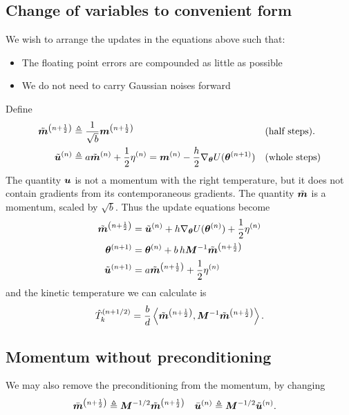 \documentclass{article}
\begin{document}
{\subsection{Change of variables to convenient form}
We wish to arrange the updates in the equations above such that:
\begin{itemize}
 \item The floating point errors are compounded as little as possible
 \item We do not need to carry Gaussian noises forward
\end{itemize}

Define
\begin{align}
  \tilde{{\bm{m}}}^{{\left( n+\frac{1}{2} \right)}} &\triangleq \frac{1}{\sqrt{b}}{\bm{m}}^{{\left( n+\frac{1}{2} \right)}} &&\text{(half steps)}. \\
\tilde{{\bm{u}}}^{{\left( n \right)}} &\triangleq a\tilde{{\bm{m}}}^{{\left( n \right)}} + \frac{1}{2}\eta^{{\left( n \right)}} = {\bm{m}}^{{\left( n \right)}} - \frac{h}{2}{\nabla_{\boldsymbol\theta} U({\boldsymbol\theta}^{{\left( n+1 \right)}})} &&\text{(whole steps)} \\
\end{align}
The quantity ${\bm{u}}$ is not a momentum with the right temperature, but it does not
contain gradients from its contemporaneous gradients. The quantity $\tilde{{\bm{m}}}$
is a momentum, scaled by $\sqrt{b}$. Thus the update equations become
\begin{align}
\tilde{{\bm{m}}}^{{\left( n+\frac{1}{2} \right)}} &= \tilde{{\bm{u}}}^{{\left( n \right)}} + h{\nabla_{\boldsymbol\theta} U({\boldsymbol\theta}^{{\left( n \right)}})}  + \frac{1}{2}\eta^{{\left( n \right)}} \\
{\boldsymbol\theta}^{{\left( n+1 \right)}} &= {\boldsymbol\theta}^{{\left( n \right)}}+ b\, h {\bm{M}}^{-1} \tilde{{\bm{m}}}^{{\left( n+\frac{1}{2} \right)}}\\
\tilde{{\bm{u}}}^{{\left( n+1 \right)}} &= a\tilde{{\bm{m}}}^{{\left( n+\frac{1}{2} \right)}} + \frac{1}{2}\eta^{{\left( n \right)}}\\
\end{align}
and the kinetic temperature we can calculate is
\begin{equation}
  \hat{T}^{{\left( n+1/2 \right)}}_k = \frac{b}{d}\left\langle \tilde{{\bm{m}}}^{{\left( n+\frac{1}{2} \right)}}, {\bm{M}}^{-1}\tilde{{\bm{m}}}^{{\left( n+\frac{1}{2} \right)}}\right\rangle.
\end{equation}

\subsection{Momentum without preconditioning}

We may also remove the preconditioning from the momentum, by changing
\begin{align}
\bar{{\bm{m}}}^{{\left( n + \frac{1}{2} \right)}} &\triangleq {\bm{M}}^{-1/2} \tilde{{\bm{m}}}^{{\left( n + \frac{1}{2} \right)}} &
\bar{{\bm{u}}}^{{\left( n \right)}} &\triangleq {\bm{M}}^{-1/2} \tilde{{\bm{u}}}^{{\left( n \right)}}.
\end{align}

}
\end{document}
